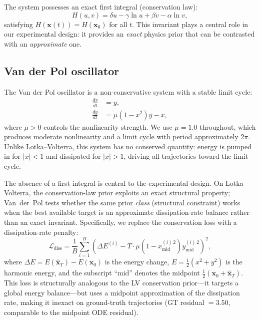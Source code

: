 \documentclass[11pt]{article}
\begin{document}
The system possesses an exact first integral (conservation law):
\begin{equation}
H(u,v) = \delta u - \gamma \ln u + \beta v - \alpha \ln v,
\label{eq:lv-invariant}
\end{equation}
satisfying $H(\bm{x}(t)) = H(\bm{x}_0)$ for all $t$.
This invariant plays a central role in our experimental design: it provides an \emph{exact} physics prior that can be contrasted with an \emph{approximate} one.

\subsection{Van der Pol oscillator}
\label{sec:vdp-system}

The Van der Pol oscillator is a non-conservative system with a stable limit cycle:
\begin{align}
\frac{dx}{dt} &= y, \label{eq:vdp-x}\\
\frac{dy}{dt} &= \mu(1 - x^2)y - x, \label{eq:vdp-y}
\end{align}
where $\mu > 0$ controls the nonlinearity strength.
We use $\mu = 1.0$ throughout, which produces moderate nonlinearity and a limit cycle with period approximately $2\pi$.
Unlike Lotka--Volterra, this system has no conserved quantity: energy is pumped in for $|x| < 1$ and dissipated for $|x| > 1$, driving all trajectories toward the limit cycle.

The absence of a first integral is central to the experimental design.
On Lotka--Volterra, the conservation-law prior exploits an exact structural property; Van~der~Pol tests whether the same prior \emph{class} (structural constraint) works when the best available target is an approximate dissipation-rate balance rather than an exact invariant.
Specifically, we replace the conservation loss with a dissipation-rate penalty:
\begin{equation}
\mathcal{L}_{\mathrm{diss}} = \frac{1}{B}\sum_{i=1}^{B}
\left(
\Delta E^{(i)} - T \cdot \mu\left(1 - x_{\mathrm{mid}}^{(i)\,2}\right) y_{\mathrm{mid}}^{(i)\,2}
\right)^2,
\label{eq:vdp-dissipation}
\end{equation}
where $\Delta E = E(\hat{\bm{x}}_T) - E(\bm{x}_0)$ is the energy change, $E = \tfrac{1}{2}(x^2 + y^2)$ is the harmonic energy, and the subscript ``mid'' denotes the midpoint $\tfrac{1}{2}(\bm{x}_0 + \hat{\bm{x}}_T)$.
This loss is structurally analogous to the LV conservation prior---it targets a global energy balance---but uses a midpoint approximation of the dissipation rate, making it inexact on ground-truth trajectories (GT residual $= 3.50$, comparable to the midpoint ODE residual).
\end{document}

